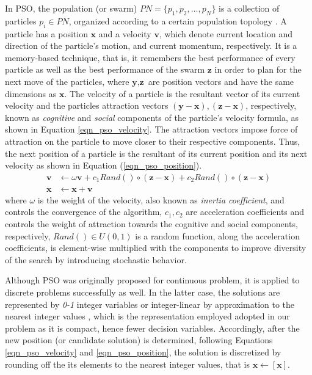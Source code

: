 In PSO, the population (or swarm) $PN=\{p_1,p_2,…,p_N\}$ is a collection of particles $p_i\in PN$, organized according to a certain population topology \cite{Liu2016TopologyOptimization}. A particle has a position $\textbf{x}$ and a velocity $\textbf{v}$, which denote current location and direction of the particle's motion, and current momentum, respectively. It is a memory-based technique, that is, it remembers the best performance of every particle as well as the best performance of the swarm $\textbf{z}$ in order to plan for the next move of the particles, where $\textbf{y},\textbf{z}$ are position vectors and have the same dimensions as $\textbf{x}$. The velocity of a particle is the resultant vector of its current velocity and the particles attraction vectors $(\textbf{y}-\textbf{x}), (\textbf{z}-\textbf{x})$, respectively, known as \textit{cognitive} and \textit{social} components of the  particle's velocity formula, as shown in Equation \ref{eqn_pso_velocity}. The attraction vectors impose force of attraction on the particle to move closer to their respective components. Thus, the next position of a particle is the resultant of its current position and its next velocity as shown in Equation (\ref{eqn_pso_position}).
\begin{align}
    \label{eqn_pso_velocity}
    \textbf{v} &\leftarrow  \omega\textbf{v} + c_1Rand()\circ(\textbf{z}-\textbf{x}) + c_2Rand()\circ(\textbf{z}-\textbf{x})\\
    \label{eqn_pso_position}
    \textbf{x} &\leftarrow \textbf{x} + \textbf{v}
\end{align}
where $\omega$ is the weight of the velocity, also known as \textit{inertia coefficient}, and controls the convergence of the algorithm, $c_1, c_2$ are acceleration coefficients and controls the weight of attraction towards the cognitive and social components, respectively, $Rand()\in U(0,1)$ is a random function, along the acceleration coefficients, is element-wise multiplied with the components to improve diversity of the search by introducing stochastic behavior.

Although PSO was originally proposed for continuous problem, it is applied to discrete problems successfully as well. In the latter case, the solutions are represented by \textit{0-1} integer variables \cite{KennedyAAlgorithm} or integer-linear by approximation to the nearest integer values \cite{Clerc2000DiscreteProblem}, which is the representation employed adopted in our problem as it is compact, hence fewer decision variables. Accordingly, after the new position (or candidate solution) is determined, following Equations \ref{eqn_pso_velocity} and \ref{eqn_pso_position}, the solution is discretized by rounding off the its elements to the nearest integer values, that is $\textbf{x}\leftarrow [\textbf{x}]$.



